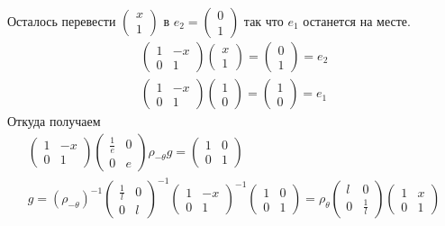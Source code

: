 	Осталось перевести $\begin{pmatrix} x \\ 1 \end{pmatrix}$ в $e_2 = \begin{pmatrix} 0 \\ 1 \end{pmatrix}$ так что $e_1$ останется на месте.
	\begin{gather*}
		\begin{pmatrix}
			1 & -x\\
			0 & 1
		\end{pmatrix}
		\begin{pmatrix}
			x \\ 1
		\end{pmatrix}
		=
		\begin{pmatrix}
			0 \\ 1
		\end{pmatrix}
		=
		e_2\\
		\begin{pmatrix}
			1 & -x\\
			0 & 1
		\end{pmatrix}
		\begin{pmatrix}
			1 \\ 0
		\end{pmatrix}
		=
		\begin{pmatrix}
			1 \\ 0
		\end{pmatrix}
		=
		e_1
	\end{gather*}
	Откуда получаем
	\begin{gather*}
		\begin{pmatrix}
			1 & -x\\
			0 & 1
		\end{pmatrix}
		\begin{pmatrix}
			\frac{1}{e} & 0\\
			0 & e
		\end{pmatrix}
		\rho_{-\theta}g
		=
		\begin{pmatrix}
			1 & 0\\
			0 & 1
		\end{pmatrix}\\
		g = (\rho_{-\theta})^{-1}
		\begin{pmatrix}
			\frac{1}{l} & 0\\
			0 & l
		\end{pmatrix}^{-1}
		\begin{pmatrix}
			1 & -x\\
			0 & 1
		\end{pmatrix}^{-1}
		\begin{pmatrix}
			1 & 0\\
			0 & 1
		\end{pmatrix}
		=
		\rho_{\theta}
		\begin{pmatrix}
			l & 0\\
			0 & \frac{1}{l}
		\end{pmatrix}
		\begin{pmatrix}
			1 & x\\
			0 & 1
		\end{pmatrix}
	\end{gather*}
